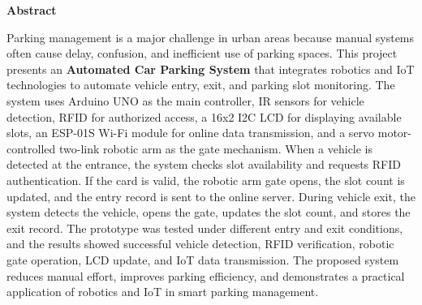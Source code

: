 
\newpage
\begin{center}

    \vspace*{0.05cm}
    \Large
    \textbf{Abstract}\\
    \vspace{0.5cm}

\end{center}

Parking management is a major challenge in urban areas because manual systems often cause delay, confusion, and inefficient use of parking spaces. This project presents an \textbf{Automated Car Parking System} that integrates robotics and IoT technologies to automate vehicle entry, exit, and parking slot monitoring. The system uses Arduino UNO as the main controller, IR sensors for vehicle detection, RFID for authorized access, a 16x2 I2C LCD for displaying available slots, an ESP-01S Wi-Fi module for online data transmission, and a servo motor-controlled two-link robotic arm as the gate mechanism. When a vehicle is detected at the entrance, the system checks slot availability and requests RFID authentication. If the card is valid, the robotic arm gate opens, the slot count is updated, and the entry record is sent to the online server. During vehicle exit, the system detects the vehicle, opens the gate, updates the slot count, and stores the exit record. The prototype was tested under different entry and exit conditions, and the results showed successful vehicle detection, RFID verification, robotic gate operation, LCD update, and IoT data transmission. The proposed system reduces manual effort, improves parking efficiency, and demonstrates a practical application of robotics and IoT in smart parking management.

